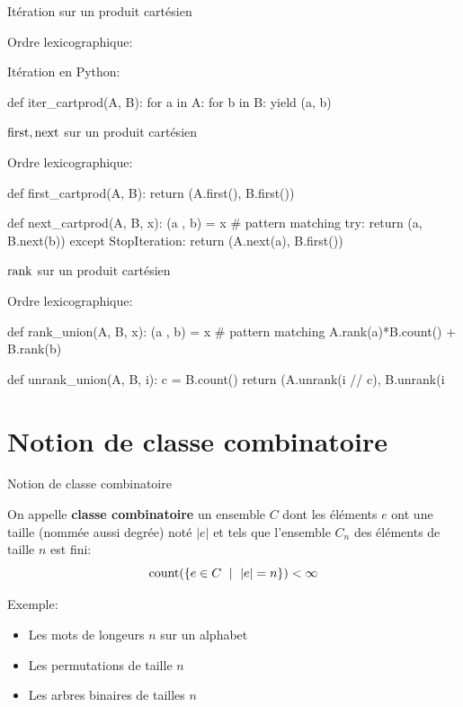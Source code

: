 \documentclass{beamer}
\begin{document}
\begin{frame}[fragile]{Itération sur un produit cartésien}

  Ordre lexicographique:
  \bigskip

  Itération en Python:
\begin{listing}{1}
    def iter_cartprod(A, B):
        for a in A:
            for b in B:
                yield (a, b)
\end{listing}
\end{frame}

\begin{frame}[fragile]{$\operatorname{first}, \operatorname{next}$ sur un produit cartésien}

  Ordre lexicographique:
  \bigskip
\begin{listing}{1}
    def first_cartprod(A, B):
        return (A.first(), B.first())

    def next_cartprod(A, B, x):
        (a , b) = x      # pattern matching
        try:
           return (a, B.next(b))
        except StopIteration:
           return (A.next(a), B.first())
\end{listing}
\end{frame}


\begin{frame}[fragile]{$\operatorname{rank}$ sur un produit cartésien}

  Ordre lexicographique:
  \bigskip
\begin{listing}{1}
    def rank_union(A, B, x):
        (a , b) = x      # pattern matching
        A.rank(a)*B.count() + B.rank(b)

    def unrank_union(A, B, i):
        c = B.count()
        return (A.unrank(i // c), B.unrank(i %
\end{listing}
\end{frame}


\section{Notion de classe combinatoire}

\begin{frame}{Notion de classe combinatoire}
  \begin{DEFN}
    On appelle \textbf{classe combinatoire} un ensemble $C$ dont les éléments
    $e$ ont une taille (nommée aussi degrée) noté $|e|$ et tels que l'ensemble
    $C_n$ des éléments de taille $n$ est fini:
    \[
    \operatorname{count}(\{e\in C\ \mid\ |e| = n\}) < \infty
    \]
  \end{DEFN}
  Exemple:
  \begin{itemize}
  \item Les mots de longeurs $n$ sur un alphabet
  \item Les permutations de taille $n$
  \item Les arbres binaires de tailles $n$
  \end{itemize}
\end{frame}
\end{document}
